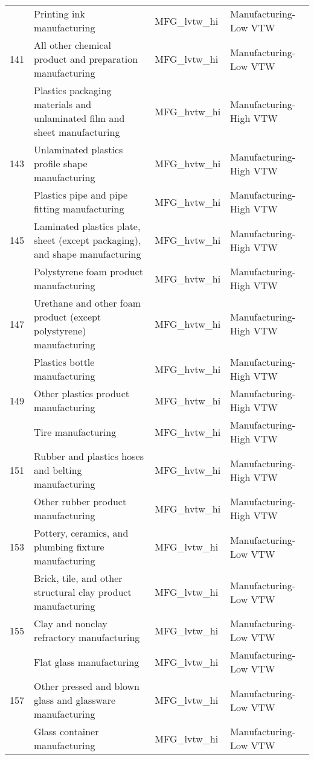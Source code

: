 \begin{landscape}
\begin{small}
\begin{longtable}{clll}
\gray 140 & Printing ink manufacturing & MFG\_lvtw\_hi & Manufacturing-Low VTW \\
141 & All other chemical product and preparation manufacturing & MFG\_lvtw\_hi & Manufacturing-Low VTW \\
\gray 142 & Plastics packaging materials and unlaminated film and sheet manufacturing & MFG\_hvtw\_hi & Manufacturing-High VTW \\
143 & Unlaminated plastics profile shape manufacturing & MFG\_hvtw\_hi & Manufacturing-High VTW \\
\gray 144 & Plastics pipe and pipe fitting manufacturing & MFG\_hvtw\_hi & Manufacturing-High VTW \\
145 & Laminated plastics plate, sheet (except packaging), and shape manufacturing & MFG\_hvtw\_hi & Manufacturing-High VTW \\
\gray 146 & Polystyrene foam product manufacturing & MFG\_hvtw\_hi & Manufacturing-High VTW \\
147 & Urethane and other foam product (except polystyrene) manufacturing & MFG\_hvtw\_hi & Manufacturing-High VTW \\
\gray 148 & Plastics bottle manufacturing & MFG\_hvtw\_hi & Manufacturing-High VTW \\
149 & Other plastics product manufacturing & MFG\_hvtw\_hi & Manufacturing-High VTW \\
\gray 150 & Tire manufacturing & MFG\_hvtw\_hi & Manufacturing-High VTW \\
151 & Rubber and plastics hoses and belting manufacturing & MFG\_hvtw\_hi & Manufacturing-High VTW \\
\gray 152 & Other rubber product manufacturing & MFG\_hvtw\_hi & Manufacturing-High VTW \\
153 & Pottery, ceramics, and plumbing fixture manufacturing & MFG\_lvtw\_hi & Manufacturing-Low VTW \\
\gray 154 & Brick, tile, and other structural clay product manufacturing & MFG\_lvtw\_hi & Manufacturing-Low VTW \\
155 & Clay and nonclay refractory manufacturing & MFG\_lvtw\_hi & Manufacturing-Low VTW \\
\gray 156 & Flat glass manufacturing & MFG\_lvtw\_hi & Manufacturing-Low VTW \\
157 & Other pressed and blown glass and glassware manufacturing & MFG\_lvtw\_hi & Manufacturing-Low VTW \\
\gray 158 & Glass container manufacturing & MFG\_lvtw\_hi & Manufacturing-Low VTW \\

\end{longtable}
\end{small}
\end{landscape}
